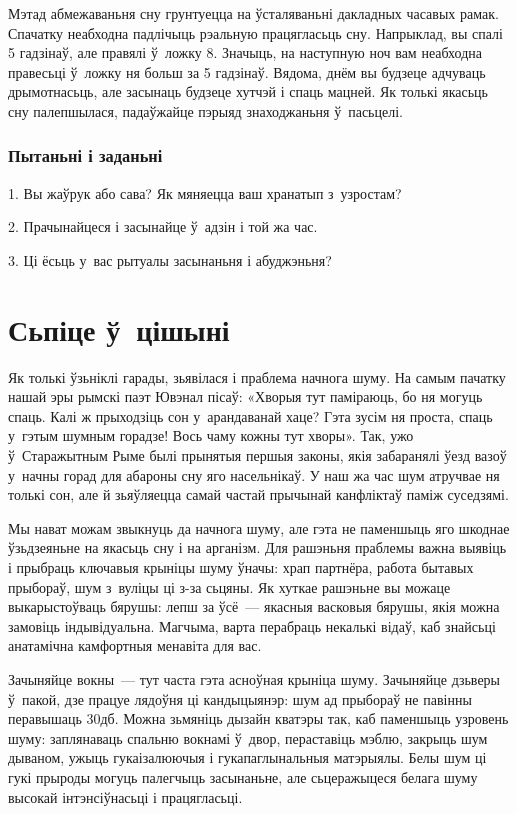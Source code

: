 Мэтад абмежаваньня сну грунтуецца на ўсталяваньні дакладных часавых рамак. Спачатку неабходна падлічыць рэальную працягласьць сну. Напрыклад, вы спалі 5 гадзінаў, але правялі ў~ложку 8. Значыць, на наступную ноч вам неабходна правесьці ў~ложку ня больш за 5 гадзінаў. Вядома, днём вы будзеце адчуваць дрымотнасьць, але засынаць будзеце хутчэй і спаць мацней. Як толькі якасьць сну палепшылася, падаўжайце пэрыяд знаходжаньня ў~пасьцелі.

\subsubsection{Пытаньні і заданьні}

1. Вы жаўрук або сава? Як мяняецца ваш хранатып з~узростам?

2. Прачынайцеся і засынайце ў~адзін і той жа час.

3. Ці ёсьць у~вас рытуалы засынаньня і абуджэньня?


\section{Сьпіце ў~цішыні}

Як толькі ўзьніклі гарады, зьявілася і праблема начнога шуму. На самым пачатку нашай эры рымскі паэт Ювэнал пісаў: «Хворыя тут паміраюць, бо ня могуць спаць. Калі ж прыходзіць сон у~арандаванай хаце? Гэта зусім ня проста, спаць у~гэтым шумным горадзе! Вось чаму кожны тут хворы». Так, ужо ў~Старажытным Рыме былі прынятыя першыя законы, якія забаранялі ўезд вазоў у~начны горад для абароны сну яго насельнікаў. У наш жа час шум атручвае ня толькі сон, але й зьяўляецца самай частай прычынай канфліктаў паміж суседзямі.

Мы нават можам звыкнуць да начнога шуму, але гэта не паменшыць яго шкоднае ўзьдзеяньне на якасьць сну і на арганізм. Для рашэньня праблемы важна выявіць і прыбраць ключавыя крыніцы шуму ўначы: храп партнёра, работа бытавых прыбораў, шум з~вуліцы ці з-за сьцяны. Як хуткае рашэньне вы можаце выкарыстоўваць бярушы: лепш за ўсё~--- якасныя васковыя бярушы, якія можна замовіць індывідуальна. Магчыма, варта перабраць некалькі відаў, каб знайсьці анатамічна камфортныя менавіта для вас.

Зачыняйце вокны~--- тут часта гэта асноўная крыніца шуму. Зачыняйце дзьверы ў~пакой, дзе працуе лядоўня ці кандыцыянэр: шум ад прыбораў не павінны перавышаць 30дб. Можна зьмяніць дызайн кватэры так, каб паменшыць узровень шуму: заплянаваць спальню вокнамі ў~двор, пераставіць мэблю, закрыць шум дываном, ужыць гукаізалюючыя і гукапаглынальныя матэрыялы. Белы шум ці гукі прыроды могуць палегчыць засынаньне, але сьцеражыцеся белага шуму высокай інтэнсіўнасьці і працягласьці.

